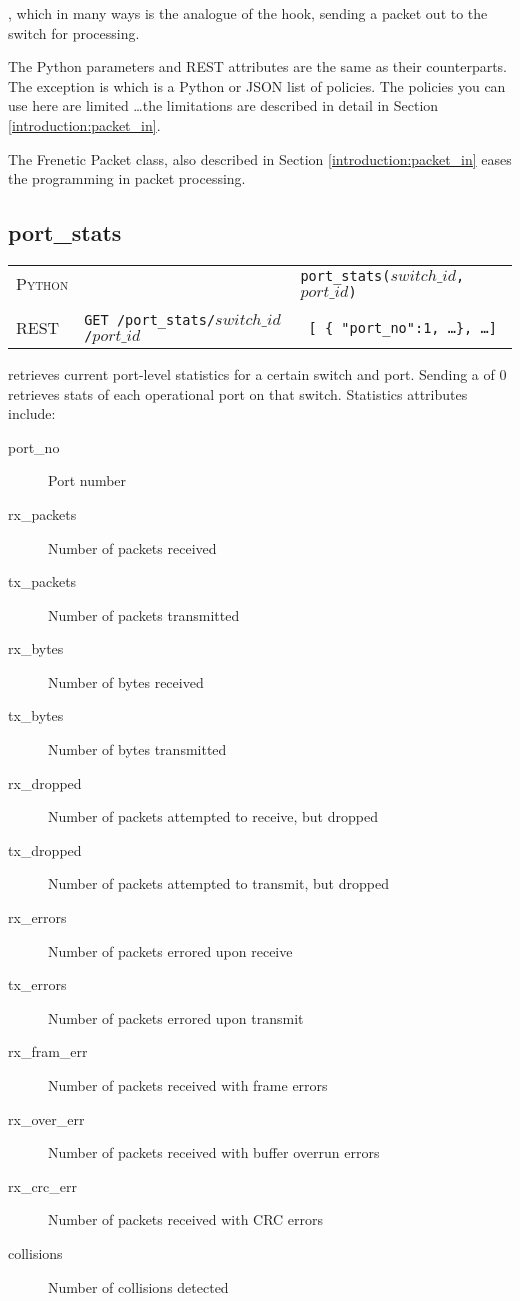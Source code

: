 , which in many ways is the analogue of the  hook, sending a packet
out to the switch for processing. 

The Python parameters and REST attributes are the same as their  counterparts.
The exception is  which is a Python or JSON list of policies.  The policies you can
use here are limited \ldots the limitations are described in detail in Section \ref{introduction:packet_in}.  

The Frenetic Packet class, also described in Section \ref{introduction:packet_in} eases the programming
in packet processing.

\subsection{port\_stats}

\bigskip
\begin{tabularx}{\linewidth}{llX}
\textsc{Python} &  & \texttt{port\_stats($switch\_id$, $port\_id$)} \\ \\
\textsc{REST} & \texttt{GET /port\_stats/$switch\_id$/$port\_id$} & 
  \texttt{ [ \{ "port\_no":1, \ldots \}, \ldots ] } 
\end{tabularx}

 retrieves current port-level statistics for a certain switch and port.  Sending a 
 of 0 retrieves stats of each operational port on that switch.   Statistics attributes
include:

\begin{description}
\item[port\_no] Port number  
\item[rx\_packets] Number of packets received  
\item[tx\_packets] Number of packets transmitted  
\item[rx\_bytes] Number of bytes received  
\item[tx\_bytes] Number of bytes transmitted  
\item[rx\_dropped] Number of packets attempted to receive, but dropped  
\item[tx\_dropped] Number of packets attempted to transmit, but dropped
\item[rx\_errors] Number of packets errored upon receive 
\item[tx\_errors] Number of packets errored upon transmit
\item[rx\_fram\_err] Number of packets received with frame errors
\item[rx\_over\_err] Number of packets received with buffer overrun errors
\item[rx\_crc\_err] Number of packets received with CRC errors
\item[collisions] Number of collisions detected
\end{description}


